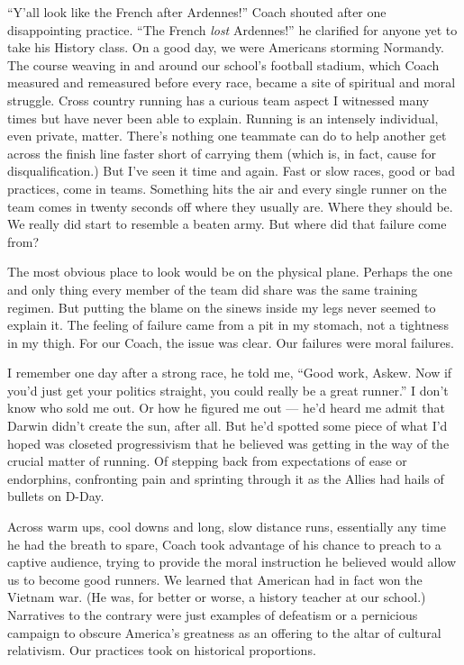 \documentclass[12pt, oneside]{memoir}
\begin{document}
``Y'all look like the French after Ardennes!'' Coach shouted after one
disappointing practice.
``The French \textit{lost} Ardennes!'' he clarified for anyone yet to
take his History class.
On a good day, we were Americans storming Normandy.
The course weaving in and around our school's football
stadium, which Coach measured and remeasured before every race, became
a site of spiritual and moral struggle.
Cross country running has a curious team aspect I witnessed many times
but have never been able to explain.
Running is an intensely individual, even private, matter.
There's nothing one teammate can do to help another get across the
finish line faster short of carrying them (which is, in fact, cause
for disqualification.)
But I've seen it time and again.
Fast or slow races, good or bad practices, come in teams.
Something hits the air and every single runner on the team comes in
twenty seconds off where they usually are.
Where they should be.
We really did start to resemble a beaten army.
But where did that failure come from?

The most obvious place to look would be on the physical plane.
Perhaps the one and only thing every member of the team did share was
the same training regimen.
But putting the blame on the sinews inside my legs never seemed to
explain it.
The feeling of failure came from a pit in my stomach, not a tightness
in my thigh.
For our Coach, the issue was clear.
Our failures were moral failures.

I remember one day after a strong race, he told me, ``Good work,
Askew. Now if you'd just get your politics straight, you could really
be a great runner.''
I don't know who sold me out.
Or how he figured me out --- he'd heard me admit that Darwin didn't
create the sun, after all.
But he'd spotted some piece of what I'd hoped was closeted
progressivism that he believed was getting in the way of the crucial
matter of running.
Of stepping back from expectations of ease or endorphins, confronting
pain and sprinting through it as the Allies had hails of bullets on
D-Day.

Across warm ups, cool downs and long, slow distance runs, essentially
any time he had the breath to spare, Coach took advantage of his
chance to preach to a captive audience, trying to provide the moral
instruction he believed would allow us to become good runners.
We learned that American had in fact won the Vietnam war.
(He was, for better or worse, a history teacher at our school.)
Narratives to the contrary were just examples of defeatism or a
pernicious campaign to obscure America's greatness as an offering to
the altar of cultural relativism.
Our practices took on historical proportions.
\end{document}
